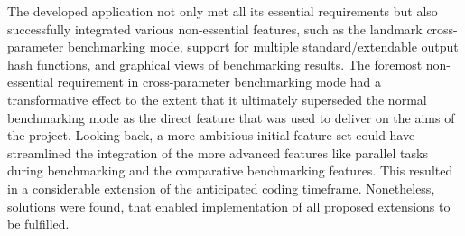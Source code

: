 \documentclass[]{final_report}
\theoremstyle{definition}
\begin{document}
The developed application not only met all its essential requirements but also successfully integrated various non-essential features, such as the landmark  cross-parameter benchmarking mode, support for multiple standard/extendable output hash functions, and graphical views of benchmarking results. 
The foremost non-essential requirement in cross-parameter benchmarking mode had a transformative effect to the extent that it ultimately superseded the normal benchmarking mode as the direct feature that was used to deliver on the aims of the project. Looking back, a more ambitious initial feature set could have streamlined the integration of the more advanced features like parallel tasks during benchmarking and the comparative benchmarking features. This resulted in a considerable extension of the anticipated coding timeframe. Nonetheless, solutions were found, that enabled implementation of all proposed extensions to be fulfilled.













\cleardoublepage
{}
{}
\listoftables



{}
\listoffigures

\cleardoublepage
{}
{}
\printbibliography
\label{endpage}
\end{document}
